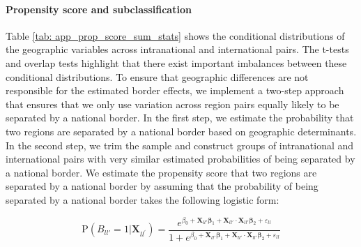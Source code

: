 \paragraph{Propensity score and subclassification} Table \ref{tab: app_prop_score_sum_stats} shows the conditional distributions of the geographic variables across intranational and international pairs. The t-tests and overlap tests highlight that there exist important imbalances between these conditional distributions. To ensure that geographic differences are not responsible for the estimated border effects, we implement a two-step approach that ensures that we only use variation across region pairs equally likely to be separated by a national border. In the first step, we estimate the probability that two regions are separated by a national border based on geographic determinants. In the second step, we trim the sample and construct groups of intranational and international pairs with very similar estimated probabilities of being separated by a national border. We estimate the propensity score that two regions are separated by a national border by assuming that the probability of being separated by a national border takes the following logistic form: 
\begin{linenomath*}
    \begin{equation}\label{eq:prop_score}
        \text{P}(B_{ll'} = 1|\boldsymbol{X}_{ll^{'}}) 
            = \frac{e^{ \beta_0 + \boldsymbol{X}_{ll'}\boldsymbol{\beta}_1 + \boldsymbol{X}_{ll'}\cdot\boldsymbol{X}_{ll'}\boldsymbol{\beta}_2 + \varepsilon_{ll}}}
                   {1 + e^{\beta_0 + \boldsymbol{X}_{ll'}\boldsymbol{\beta}_1 + \boldsymbol{X}_{ll'}\cdot\boldsymbol{X}_{ll'}\boldsymbol{\beta}_2 + \varepsilon_{ll}}}
    \end{equation}
\end{linenomath*}
